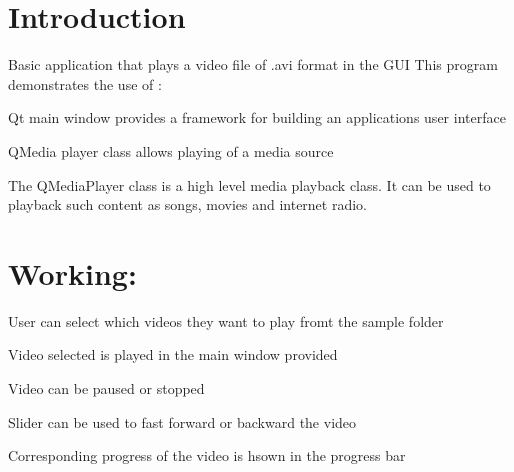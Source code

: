 \hypertarget{index_intro_sec}{}\section{Introduction}\label{index_intro_sec}
Basic application that plays a video file of .avi format in the G\+UI This program demonstrates the use of \+: \begin{DoxyItemize}
\item Qt main window provides a framework for building an application\textquotesingle{}s user interface \item Q\+Media player class allows playing of a media source \item The Q\+Media\+Player class is a high level media playback class. It can be used to playback such content as songs, movies and internet radio. ~\newline
 ~\newline
 ~\newline
\end{DoxyItemize}
\hypertarget{index_how_sec}{}\section{Working\+:}\label{index_how_sec}
\begin{DoxyItemize}
\item User can select which videos they want to play fromt the sample folder \item Video selected is played in the main window provided \item Video can be paused or stopped \item Slider can be used to fast forward or backward the video \item Corresponding progress of the video is hsown in the progress bar  \end{DoxyItemize}
